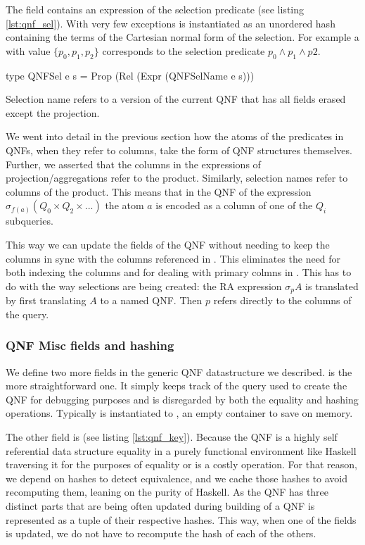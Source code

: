The  field contains an expression
of the selection predicate (see listing \ref{lst:qnf_sel}). With very few
exceptions  is instantiated as an unordered hash containing the
terms of the Cartesian normal form of the selection. For example a 
with value \(\{p_0, p_1, p_2\}\) corresponds to the selection predicate
\(p_0 \land p_1 \land p2\).

\begin{code}
  \begin{haskellcode}
    type QNFSel e s = Prop (Rel (Expr (QNFSelName e s)))
  \end{haskellcode}
  \caption{\label{lst:qnf_sel}Selection name refers to a version of
    the current QNF that has all fields erased except the projection.}
\end{code}

We went into detail in the previous section how the atoms of the predicates in QNFs,
when they refer to columns, take the form of QNF structures themselves. Further, we asserted
that the columns in the expressions of projection/aggregations refer to the
product. Similarly, selection names refer to columns of the product.
This means that in the QNF of the expression \(\sigma_{f(a)} (Q_0 \times Q_2 \times ...)\)
the atom \(a\) is encoded as a column of one of the \(Q_i\) subqueries.


This way we can update the fields of the QNF without needing to keep
the columns in sync with the columns referenced in . This
eliminates the need for both indexing the columns and for dealing with
primary colmns in . This has to do with the way
selections are being created: the RA expression \(\sigma_p A\) is
translated by first translating \(A\) to a named QNF. Then \(p\)
refers directly to the columns of the query.

\subsubsection{QNF Misc fields and hashing}

We define two more fields in the generic QNF datastructure we
described.  is the more
straightforward one. It simply keeps track of the query used to create
the QNF for debugging purposes and is disregarded by both the equality
and hashing operations. Typically  is
instantiated to , an empty container to save on memory.

The other field is  (see listing
\ref{lst:qnf_key}). Because the QNF is a highly self referential data
structure equality in a purely functional environment like Haskell
traversing it for the purposes of equality or is a costly operation.
For that reason, we depend on hashes to detect equivalence, and we
cache those hashes to avoid recomputing them, leaning on the purity of
Haskell. As the QNF has three distinct parts that are being often
updated during building of a QNF  is represented as a
tuple of their respective hashes. This way, when one of the fields is
updated, we do not have to recompute the hash of each of the others.

